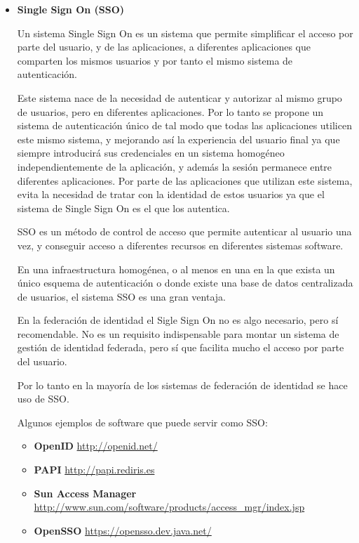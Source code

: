             \begin{itemize}

            \item \textbf{Single Sign On (SSO)}

    Un sistema Single Sign On es un sistema que permite simplificar
    el acceso por parte del usuario, y de las aplicaciones, a
    diferentes aplicaciones que comparten los mismos usuarios y por
    tanto el mismo sistema de autenticación.

    Este sistema nace de la necesidad de autenticar y autorizar al
    mismo grupo de usuarios, pero en diferentes aplicaciones. Por lo
    tanto se propone un sistema de autenticación único de tal modo
    que todas las aplicaciones utilicen este mismo sistema, y
    mejorando así la experiencia del usuario final ya que siempre
    introducirá sus credenciales en un sistema homogéneo
    independientemente de la aplicación, y además la sesión permanece
    entre diferentes aplicaciones. Por parte de las aplicaciones que
    utilizan este sistema, evita la necesidad de tratar con la
    identidad de estos usuarios ya que el sistema de Single Sign On
    es el que los autentica.

    SSO es un método de control de acceso que permite autenticar al
    usuario una vez, y conseguir acceso a diferentes recursos en
    diferentes sistemas software.

    En una infraestructura homogénea, o al menos en una en la que
    exista un único esquema de autenticación o donde existe una base
    de datos centralizada de usuarios, el sistema SSO es una gran
    ventaja.

    En la federación de identidad el Sigle Sign On no es algo
    necesario, pero sí recomendable. No es un requisito indispensable
    para montar un sistema de gestión de identidad federada, pero sí
    que facilita mucho el acceso por parte del usuario.

    Por lo tanto en la mayoría de los sistemas de federación de
    identidad se hace uso de SSO.

    Algunos ejemplos de software que puede servir como SSO:
    \begin{itemize}
        \item \textbf{OpenID} \href{http://openid.net/}{http://openid.net/}
        \item \textbf{PAPI} \href{http://papi.rediris.es}{http://papi.rediris.es}
        \item \textbf{Sun Access Manager} \href{http://www.sun.com/software/products/access_mgr/index.jsp}{http://www.sun.com/software/products/access\_mgr/index.jsp}
        \item \textbf{OpenSSO} \href{https://opensso.dev.java.net/}{https://opensso.dev.java.net/}
    \end{itemize}


\end{itemize}
